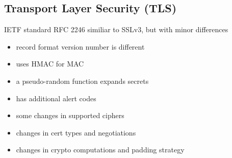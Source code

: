 \documentclass{article}
\begin{document}
\subsection{Transport Layer Security (TLS)}
IETF standard RFC 2246 similiar to SSLv3, but with minor differences
\begin{itemize}
    \item record format version number is different
    \item uses HMAC for MAC
    \item a pseudo-random function expands secrets
    \item has additional alert codes
    \item some changes in supported ciphers
    \item changes in cert types and negotiations
    \item changes in crypto computations and padding strategy
\end{itemize}
\end{document}
